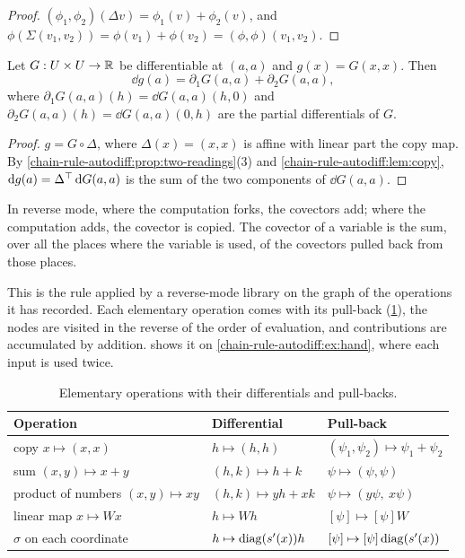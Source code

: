\begin{notechapter}
\begin{proof}
$(\phi_1, \phi_2)(\Delta v) = \phi_1(v) + \phi_2(v)$, and
$\phi(\Sigma(v_1, v_2)) = \phi(v_1) + \phi(v_2)
= (\phi, \phi)(v_1, v_2)$.
\end{proof}

\begin{proposition}\label{chain-rule-autodiff:prop:fanout}
Let $G:U\times U\to\mathbb{R}$ be differentiable at $(a, a)$ and $g(x) = G(x, x)$.
Then
\[
  \dd g(a) = \partial_1G(a, a) + \partial_2G(a, a) ,
\]
where $\partial_1G(a, a)(h) = \dd G(a, a)(h, 0)$ and
$\partial_2G(a, a)(h) = \dd G(a, a)(0, h)$ are the partial differentials
of $G$.
\end{proposition}

\begin{proof}
$g = G\circ\Delta$, where $\Delta(x) = (x, x)$ is affine with linear part
the copy map. By \cref{chain-rule-autodiff:prop:two-readings}(3) and
\cref{chain-rule-autodiff:lem:copy},
$\mathrm{d} g(a) = \Delta^{\top}\,\mathrm{d} G(a, a)$ is the sum of the two components of
$\dd G(a, a)$.
\end{proof}

\begin{keyidea}
In reverse mode, where the computation forks, the covectors add; where the
computation adds, the covector is copied. The covector of a variable is
the sum, over all the places where the variable is used, of the covectors
pulled back from those places.
\end{keyidea}

This is the rule applied by a reverse-mode library on the graph of the
operations it has recorded. Each elementary operation comes with its
pull-back (\cref{chain-rule-autodiff:tab:local}), the nodes are visited in
the reverse of the order of evaluation, and contributions are accumulated
by addition.  shows it on
\cref{chain-rule-autodiff:ex:hand}, where each input is used twice.

\begin{table}[ht]
\centering
\small
\begin{tabular}{@{}lll@{}}
\toprule
Operation & Differential & Pull-back \\
\midrule
copy $x\mapsto(x, x)$ & $h\mapsto(h, h)$
  & $(\psi_1, \psi_2)\mapsto\psi_1 + \psi_2$ \\
sum $(x, y)\mapsto x + y$ & $(h, k)\mapsto h + k$
  & $\psi\mapsto(\psi, \psi)$ \\
product of numbers $(x, y)\mapsto xy$ & $(h, k)\mapsto yh + xk$
  & $\psi\mapsto(y\psi,\ x\psi)$ \\
linear map $x\mapsto Wx$ & $h\mapsto Wh$ & $[\psi]\mapsto[\psi]W$ \\
$\sigma$ on each coordinate & $h\mapsto\operatorname{diag}(s'(x))h$
  & $[\psi]\mapsto[\psi]\operatorname{diag}(s'(x))$ \\
\bottomrule
\end{tabular}
\caption{Elementary operations with their differentials and pull-backs.}
\label{chain-rule-autodiff:tab:local}
\end{table}


\end{notechapter}
